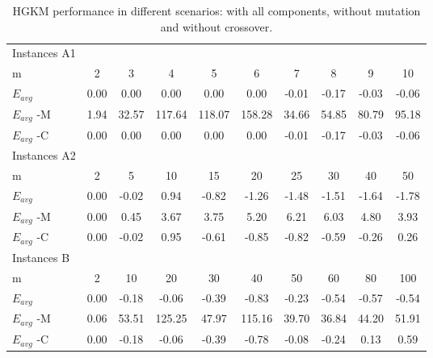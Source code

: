 \begin{table}[H]
{\small
\centering
\begin{tabular}{lccccccccc}
\hline
Instances A1 &      &       &        &        &        &       &       &       &       \\
m            & 2    & 3     & 4      & 5      & 6      & 7     & 8     & 9     & 10    \\
$E_{avg}$    & 0.00 & 0.00  & 0.00   & 0.00   & 0.00   & -0.01 & -0.17 & -0.03 & -0.06 \\
$E_{avg}$ -M & 1.94 & 32.57 & 117.64 & 118.07 & 158.28 & 34.66 & 54.85 & 80.79 & 95.18 \\
$E_{avg}$ -C & 0.00 & 0.00  & 0.00   & 0.00   & 0.00   & -0.01 & -0.17 & -0.03 & -0.06 \\ \hline
Instances A2 &      &       &        &        &        &       &       &       &       \\
m            & 2    & 5     & 10     & 15     & 20     & 25    & 30    & 40    & 50    \\
$E_{avg}$    & 0.00 & -0.02 & 0.94   & -0.82  & -1.26  & -1.48 & -1.51 & -1.64 & -1.78 \\
$E_{avg}$ -M & 0.00 & 0.45  & 3.67   & 3.75   & 5.20   & 6.21  & 6.03  & 4.80  & 3.93  \\
$E_{avg}$ -C & 0.00 & -0.02 & 0.95   & -0.61  & -0.85  & -0.82 & -0.59 & -0.26 & 0.26  \\ \hline
Instances B  &      &       &        &        &        &       &       &       &       \\
m            & 2    & 10    & 20     & 30     & 40     & 50    & 60    & 80    & 100   \\
$E_{avg}$    & 0.00 & -0.18 & -0.06  & -0.39  & -0.83  & -0.23 & -0.54 & -0.57 & -0.54 \\
$E_{avg}$ -M & 0.06 & 53.51 & 125.25 & 47.97  & 115.16 & 39.70 & 36.84 & 44.20 & 51.91 \\
$E_{avg}$ -C & 0.00 & -0.18 & -0.06  & -0.39  & -0.78  & -0.08 & -0.24 & 0.13  & 0.59  \\ \hline
\end{tabular}
\caption{HGKM performance in different scenarios: with all components, without mutation and without crossover.}}
\label{components}
\end{table}